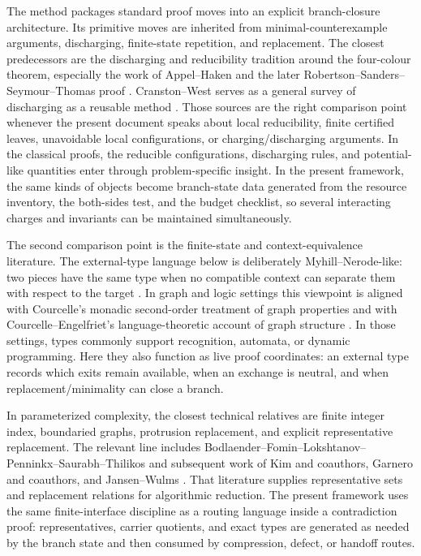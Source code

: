 \documentclass[
  11pt,
]{article}
\theoremstyle{definition}
\begin{document}
The method packages standard proof moves into an explicit branch-closure
architecture. Its primitive moves are inherited from
minimal-counterexample arguments, discharging, finite-state repetition,
and replacement. The closest predecessors are the discharging and
reducibility tradition around the four-colour theorem, especially the
work of Appel--Haken and the later Robertson--Sanders--Seymour--Thomas
proof
\citep{appel-haken-1977-discharging, appel-haken-koch-1977-reducibility, robertson-etal-1996-new-proof, robertson-etal-1997-four-colour}.
Cranston--West serves as a general survey of discharging as a reusable
method \citep{cranston-west-2017-discharging}. Those sources are the
right comparison point whenever the present document speaks about local
reducibility, finite certified leaves, unavoidable local configurations,
or charging/discharging arguments. In the classical proofs, the
reducible configurations, discharging rules, and potential-like
quantities enter through problem-specific insight. In the present
framework, the same kinds of objects become branch-state data generated
from the resource inventory, the both-sides test, and the budget
checklist, so several interacting charges and invariants can be
maintained simultaneously.

The second comparison point is the finite-state and context-equivalence
literature. The external-type language below is deliberately
Myhill--Nerode-like: two pieces have the same type when no compatible
context can separate them with respect to the target
\citep{myhill-1957-automata, nerode-1958-linear}. In graph and logic
settings this viewpoint is aligned with Courcelle's monadic second-order
treatment of graph properties and with Courcelle--Engelfriet's
language-theoretic account of graph structure
\citep{courcelle-1990-mso-graphs, courcelle-engelfriet-2012-graph-structure}.
In those settings, types commonly support recognition, automata, or
dynamic programming. Here they also function as live proof coordinates:
an external type records which exits remain available, when an exchange
is neutral, and when replacement/minimality can close a branch.

In parameterized complexity, the closest technical relatives are finite
integer index, boundaried graphs, protrusion replacement, and explicit
representative replacement. The relevant line includes
Bodlaender--Fomin--Lokshtanov--Penninkx--Saurabh--Thilikos and
subsequent work of Kim and coauthors, Garnero and coauthors, and
Jansen--Wulms
\citep{bodlaender-etal-2009-meta-kernelization, kim-etal-2012-protrusion, garnero-etal-2013-explicit-kernels, jansen-wulms-2016-lower-bounds}.
That literature supplies representative sets and replacement relations
for algorithmic reduction. The present framework uses the same
finite-interface discipline as a routing language inside a contradiction
proof: representatives, carrier quotients, and exact types are generated
as needed by the branch state and then consumed by compression, defect,
or handoff routes.
\end{document}
